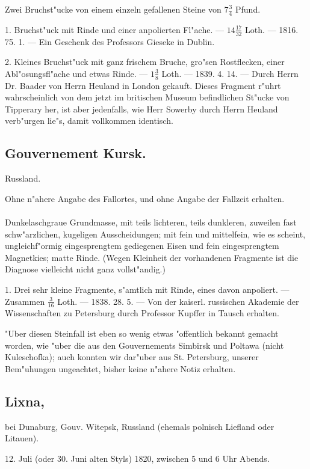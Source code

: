 \documentclass[a4paper, 11pt, oneside, polutonikogreek, german]{article}
\begin{document}
Zwei Bruchst"ucke von einem einzeln gefallenen Steine von $7\frac{3}{4}$ Pfund.

1. Bruchst"uck mit Rinde und einer anpolierten Fl"ache. --- $14\frac{17}{32}$ Loth. --- 1816. 75. 1. --- Ein Geschenk des Professors Gieseke in Dublin.

2. Kleines Bruchst"uck mit ganz frischem Bruche, gro"sen Rostflecken, einer Abl"osungsfl"ache und etwas Rinde. --- $1\frac{3}{8}$ Loth. --- 1839. 4. 14. --- Durch Herrn Dr. Baader von Herrn Heuland in London gekauft. Dieses Fragment r"uhrt wahrscheinlich von dem jetzt im britischen Museum befindlichen St"ucke von Tipperary her, ist aber jedenfalls, wie Herr Sowerby durch Herrn Heuland verb"urgen lie"s, damit vollkommen identisch.
\subsection{Gouvernement Kursk.}
\begin{center}
\small
Russland.

Ohne n"ahere Angabe des Fallortes, und ohne Angabe der Fallzeit erhalten.
\end{center}
\paragraph{}
Dunkelaschgraue Grundmasse, mit teils lichteren, teils dunkleren, zuweilen fast schw"arzlichen, kugeligen Ausscheidungen; mit fein und mittelfein, wie es scheint, ungleichf"ormig eingesprengtem gediegenen Eisen und fein eingesprengtem Magnetkies; matte Rinde. (Wegen Kleinheit der vorhandenen Fragmente ist die Diagnose vielleicht nicht ganz vollst"andig.)

1. Drei sehr kleine Fragmente, s"amtlich mit Rinde, eines davon anpoliert. --- Zusammen $\frac{3}{16}$ Loth. --- 1838. 28. 5. --- Von der kaiserl. russischen Akademie der Wissenschaften zu Petersburg durch Professor Kupffer in Tausch erhalten.

"Uber diesen Steinfall ist eben so wenig etwas "offentlich bekannt gemacht worden, wie "uber die aus den Gouvernements Simbirsk und Poltawa (nicht Kuleschofka); auch konnten wir dar"uber aus St. Petersburg, unserer Bem"uhungen ungeachtet, bisher keine n"ahere Notiz erhalten.
\subsection[Lixna.]{Lixna,}
\begin{center}
\small
bei Dunaburg, Gouv. Witepsk, Russland (ehemals polnisch Liefland oder Litauen).

12. Juli (oder 30. Juni alten Styls) 1820, zwischen 5 und 6 Uhr Abends.
\end{center}
\end{document}

